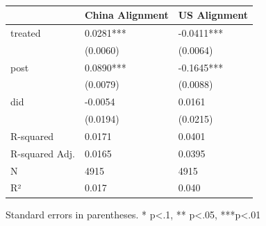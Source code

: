 \begin{table}
\caption{}
\label{}
\begin{center}
\begin{tabular}{lll}
\hline
               & China Alignment & US Alignment  \\
\hline
treated        & 0.0281***       & -0.0411***    \\
               & (0.0060)        & (0.0064)      \\
post           & 0.0890***       & -0.1645***    \\
               & (0.0079)        & (0.0088)      \\
did            & -0.0054         & 0.0161        \\
               & (0.0194)        & (0.0215)      \\
R-squared      & 0.0171          & 0.0401        \\
R-squared Adj. & 0.0165          & 0.0395        \\
N              & 4915            & 4915          \\
R²             & 0.017           & 0.040         \\
\hline
\end{tabular}
\end{center}
\end{table}
\bigskip
Standard errors in parentheses. \newline 
* p<.1, ** p<.05, ***p<.01